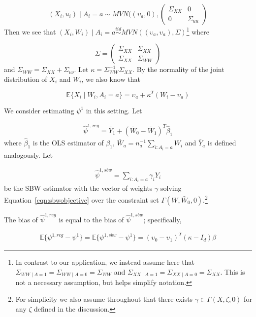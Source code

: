 \begin{equation}\label{eqn:xerrorcors}
(X_i, u_i) \mid A_i = a \sim MVN((\upsilon_a, 0), \begin{pmatrix} 
\Sigma_{XX} & 0 \\ 
0 & \Sigma_{uu}  
\end{pmatrix}
\end{equation}
%
Then we see that $(X_i, W_i) \mid A_i = a \stackrel{iid}{\sim} MVN((\upsilon_a, \upsilon_a), \Sigma)$\footnote{In contrast to our application, we instead assume here that $\Sigma_{WW \mid A = 1} = \Sigma_{WW \mid A = 0} = \Sigma_{WW}$ and $\Sigma_{XX \mid A = 1} = \Sigma_{XX \mid A = 0} = \Sigma_{XX}$. This is not a necessary assumption, but helps simplify notation.} where 

\begin{equation}\label{eqn:xwcors}
\Sigma = \begin{pmatrix} 
\Sigma_{XX} & \Sigma_{XX} \\ 
\Sigma_{XX} & \Sigma_{WW}  
\end{pmatrix}
\end{equation}
%
and $\Sigma_{WW} = \Sigma_{XX} + \Sigma_{\nu\nu}$. Let $\kappa = \Sigma_{WW}^{-1}\Sigma_{XX}$. By the normality of the joint distribution of $X_i$ and $W_i$, we also know that

\begin{equation}
\mathbb{E}\{X_i \mid W_i, A_i = a\} = \upsilon_a + \kappa^T(W_i - \upsilon_a)
\end{equation}

We consider estimating $\psi^1$ in this setting. Let 

\begin{align*}
\hat{\psi}^{1, reg} = \bar{Y}_1 + (\bar{W}_0 - \bar{W}_1)^T\hat{\beta}_1
\end{align*}
%
where $\hat{\beta}_1$ is the OLS estimator of $\beta_1$, $\bar{W}_a = n_a^{-1}\sum_{i:A_i = a} W_i$ and $\bar{Y}_a$ is defined analogously. Let 

\begin{align*}
\hat{\psi}^{1, sbw} = \sum_{i: A_i = a} \gamma_i Y_i
\end{align*}
%
be the SBW estimator with the vector of weights $\gamma$ solving Equation~\ref{eqn:sbwobjective} over the constraint set $\Gamma(W, \bar{W}_0, 0)$.\footnote{For simplicity we also assume throughout that there exists $\gamma \in \Gamma(X, \zeta, 0)$ for any $\zeta$ defined in the discussion.}

\begin{proposition}\label{cl1}
The bias of $\hat{\psi}^{1, reg}$ is equal to the bias of $\hat{\psi}^{1, sbw}$; specifically, 

\begin{align*}
\mathbb{E}\{\psi^{1, reg} - \psi^1\} = \mathbb{E}\{\psi^{1, sbw} - \psi^1\} = (\upsilon_0 - \upsilon_1)^T(\kappa - I_d)\beta
\end{align*}
\end{proposition}

